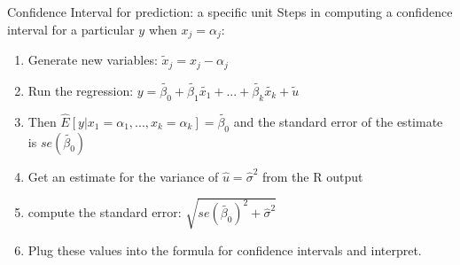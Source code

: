 \documentclass[
  ignorenonframetext,
]{beamer}
\begin{document}
\begin{frame}{Confidence Interval for prediction: a specific unit}
\protect\hypertarget{confidence-interval-for-prediction-a-specific-unit-5}{}
Steps in computing a confidence interval for a particular \(y\) when
\(x_j=\alpha_j\):

\begin{enumerate}
[1)]
\item
  Generate new variables: \(\tilde{x}_j=x_j-\alpha_j\)
\item
  Run the regression:
  \(y=\tilde{\beta_0}+\tilde{\beta_1}\tilde{x_1}+...+\tilde{\beta_k}\tilde{x_k}+\tilde{u}\)
\item
  Then \(\hat{E}[y|x_1=\alpha_1,...,x_k=\alpha_k]=\tilde{\beta_0}\) and
  the standard error of the estimate is \(se(\tilde{\beta_0})\)
\item
  Get an estimate for the variance of \(\hat{u}=\hat{\sigma}^2\) from
  the R output
\item
  compute the standard error:
  \(\sqrt{se(\tilde{\beta_0})^2+\hat{\sigma}^2}\)
\item
  Plug these values into the formula for confidence intervals and
  interpret.
\end{enumerate}
\end{frame}
\end{document}
